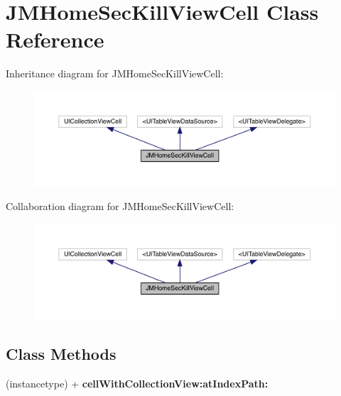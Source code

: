 \hypertarget{interface_j_m_home_sec_kill_view_cell}{}\section{J\+M\+Home\+Sec\+Kill\+View\+Cell Class Reference}
\label{interface_j_m_home_sec_kill_view_cell}


Inheritance diagram for J\+M\+Home\+Sec\+Kill\+View\+Cell\+:\nopagebreak
\begin{figure}[H]
\begin{center}
\leavevmode
\includegraphics[width=350pt]{interface_j_m_home_sec_kill_view_cell__inherit__graph}
\end{center}
\end{figure}


Collaboration diagram for J\+M\+Home\+Sec\+Kill\+View\+Cell\+:\nopagebreak
\begin{figure}[H]
\begin{center}
\leavevmode
\includegraphics[width=350pt]{interface_j_m_home_sec_kill_view_cell__coll__graph}
\end{center}
\end{figure}
\subsection*{Class Methods}
\begin{DoxyCompactItemize}
\item 
\mbox{\label{interface_j_m_home_sec_kill_view_cell_afc7f4b939345b6bae9c23b38568a8ba1}} 
(instancetype) + {\bfseries cell\+With\+Collection\+View\+:at\+Index\+Path\+:}
\end{DoxyCompactItemize}
